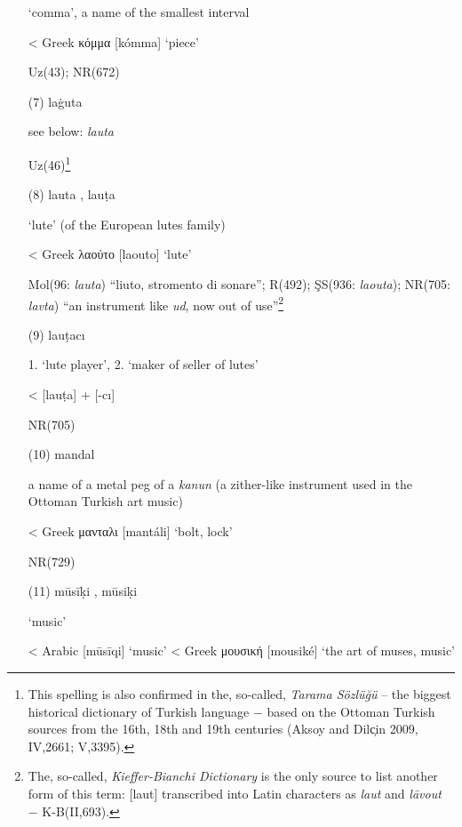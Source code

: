 \documentclass[output=paper,colorlinks,citecolor=brown,arabicfont,chinesefont]{langscibook}
\begin{document}
\begin{itemize}
    ‘comma’, a name of the smallest interval

    < Greek κόμμα [kómma] ‘piece’

    Uz(43); NR(672)
    
    \item[(7)] laġuta {}
    
    see below: \emph{lauta}

    Uz(46)\footnote{This spelling is also confirmed in the, so-called, \emph{Tarama Sözlüğü} – the biggest historical dictionary of Turkish language − based on the Ottoman Turkish sources from the 16th, 18th and 19th centuries (Aksoy and Dilc̜in 2009, IV,2661; V,3395).}

    \item[(8)] lauta {}, lauṭa {}

    ‘lute’ (of the European lutes family)

    < Greek λαούτο [laouto] ‘lute’

    Mol(96: \emph{lauta}) “liuto, stromento di sonare”; R(492); ŞS(936: \emph{laouta}); NR(705: \emph{lavta}) “an instrument like \emph{ud}, now out of use”\footnote{The, so-called, \emph{Kieffer-Bianchi Dictionary} is the only source to list another form of this term: {} [laut] transcribed into Latin characters as \emph{laut} and \emph{lāvout} − K-B(II,693).}
    
    \item[(9)] lauṭacı {}

    1. ‘lute player’, 2. ‘maker of seller of lutes’

    < {} [lauṭa] + {} [-cı]

    NR(705)

    \item[(10)] mandal {}

    a name of a metal peg of a \emph{kanun} (a zither-like instrument used in the Ottoman Turkish art music)

    < Greek μανταλι [mantáli] ‘bolt, lock’

    NR(729)
    
    \item[(11)] mūsīḳi {}, mūsiḳi {}

    ‘music’

    < Arabic {}
    [mūsīqi] ‘music’ < Greek μουσική [mousiké] ‘the art of muses, music’


\end{itemize}
\end{document}
